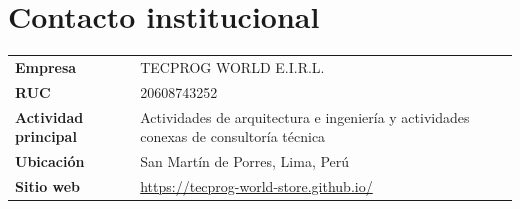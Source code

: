 \documentclass[11pt,a4paper]{article}
\begin{document}
\section*{Contacto institucional}

\begin{longtable}{>{\bfseries}p{5cm}p{10cm}}
Empresa & TECPROG WORLD E.I.R.L. \\
RUC & 20608743252 \\
Actividad principal & Actividades de arquitectura e ingeniería y actividades conexas de consultoría técnica \\
Ubicación & San Martín de Porres, Lima, Perú \\
Sitio web & \url{https://tecprog-world-store.github.io/} \\
\end{longtable}
\end{document}

